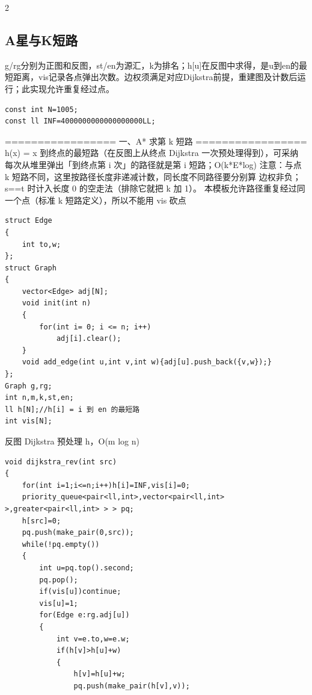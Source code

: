 \documentclass[UTF8,fontset=fandol,a4paper,twoside]{ctexart}
\newcommand{\note}[1]{{\fontsize{10}{12}\selectfont #1\par}}
\begin{document}
\begin{multicols}{2}
\subsection{A星与K短路}

\note{g/\allowbreak{}rg分别为正图和反图，st/\allowbreak{}en为源汇，k为排名；h[\allowbreak{}u]\allowbreak{}在反图中求得，是u到en的最短距离，vis记录各点弹出次数。边权须满足对应Dijkstra前提，重建图及计数后运行；此实现允许重复经过点。}
\begin{lstlisting}
const int N=1005;
const ll INF=4000000000000000000LL;
\end{lstlisting}
\note{=\allowbreak{}=\allowbreak{}=\allowbreak{}=\allowbreak{}=\allowbreak{}=\allowbreak{}=\allowbreak{}=\allowbreak{}=\allowbreak{}=\allowbreak{}=\allowbreak{}=\allowbreak{}=\allowbreak{}=\allowbreak{}=\allowbreak{}=\allowbreak{}=\allowbreak{} 一、A* 求第 k 短路 =\allowbreak{}=\allowbreak{}=\allowbreak{}=\allowbreak{}=\allowbreak{}=\allowbreak{}=\allowbreak{}=\allowbreak{}=\allowbreak{}=\allowbreak{}=\allowbreak{}=\allowbreak{}=\allowbreak{}=\allowbreak{}=\allowbreak{}=\allowbreak{}=\allowbreak{} h(\allowbreak{}x)\allowbreak{} =\allowbreak{} x 到终点的最短路（在反图上从终点 Dijkstra 一次预处理得到），可采纳 每次从堆里弹出「到终点第 i 次」的路径就是第 i 短路；O(\allowbreak{}k*E*log)\allowbreak{} 注意：与点 k 短路不同，这里按路径长度非递减计数，同长度不同路径要分别算 边权非负；s=\allowbreak{}=\allowbreak{}t 时计入长度 0 的空走法（排除它就把 k 加 1）。 本模板允许路径重复经过同一个点（标准 k 短路定义），所以不能用 vis 砍点}
\begin{lstlisting}
struct Edge
{
    int to,w;
};
struct Graph
{
    vector<Edge> adj[N];
    void init(int n)
    {
        for(int i= 0; i <= n; i++)
            adj[i].clear();
    }
    void add_edge(int u,int v,int w){adj[u].push_back({v,w});}
};
Graph g,rg;
int n,m,k,st,en;
ll h[N];//h[i] = i 到 en 的最短路
int vis[N];
\end{lstlisting}
\note{反图 Dijkstra 预处理 h，O(\allowbreak{}m log n)\allowbreak{}}
\begin{lstlisting}
void dijkstra_rev(int src)
{
    for(int i=1;i<=n;i++)h[i]=INF,vis[i]=0;
    priority_queue<pair<ll,int>,vector<pair<ll,int> >,greater<pair<ll,int> > > pq;
    h[src]=0;
    pq.push(make_pair(0,src));
    while(!pq.empty())
    {
        int u=pq.top().second;
        pq.pop();
        if(vis[u])continue;
        vis[u]=1;
        for(Edge e:rg.adj[u])
        {
            int v=e.to,w=e.w;
            if(h[v]>h[u]+w)
            {
                h[v]=h[u]+w;
                pq.push(make_pair(h[v],v));

\end{lstlisting}
\end{multicols}
\end{document}
